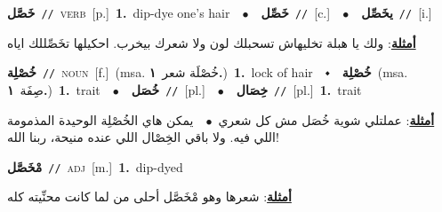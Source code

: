 \documentclass[10pt,a4paper,twoside]{article} %
\begin{document}
\begin{multicols}{2}
{\setlength\topsep{0pt}\textbf{\foreignlanguage{arabic}{خَصَّل}}\ {\color{gray}\texttt{//}\color{black}}\ \textsc{verb}\ [p.]\ \textbf{1.}~dip-dye one's hair\ \ $\bullet$\ \ \setlength\topsep{0pt}\textbf{\foreignlanguage{arabic}{خَصِّل}}\ {\color{gray}\texttt{//}\color{black}}\ [c.]\ \ $\bullet$\ \ \setlength\topsep{0pt}\textbf{\foreignlanguage{arabic}{يخَصِّل}}\ {\color{gray}\texttt{//}\color{black}}\ [i.]\  \begin{flushright}\color{gray}\foreignlanguage{arabic}{\textbf{\underline{\foreignlanguage{arabic}{أمثلة}}}: ولك يا هبلة تخليهاش تسحبلك لون ولا شعرك بيخرب. احكيلها  تخَصِّللك اياه}\end{flushright}\color{black}} \vspace{2mm}

{\setlength\topsep{0pt}\textbf{\foreignlanguage{arabic}{خُصْلِة}}\ {\color{gray}\texttt{//}\color{black}}\ \textsc{noun}\ [f.]\ \color{gray}(msa. \foreignlanguage{arabic}{خُصْلَة شعر}~\foreignlanguage{arabic}{\textbf{١.}})\color{black}\ \textbf{1.}~lock of hair\ \ $\smblkdiamond$\ \ \setlength\topsep{0pt}\textbf{\foreignlanguage{arabic}{خُصْلِة}}\ \color{gray}(msa. \foreignlanguage{arabic}{صِفَة}~\foreignlanguage{arabic}{\textbf{١.}})\color{black}\ \textbf{1.}~trait\ \ $\bullet$\ \ \setlength\topsep{0pt}\textbf{\foreignlanguage{arabic}{خُصَل}}\ {\color{gray}\texttt{//}\color{black}}\ [pl.]\ \ $\bullet$\ \ \setlength\topsep{0pt}\textbf{\foreignlanguage{arabic}{خِصَال}}\ {\color{gray}\texttt{//}\color{black}}\ [pl.]\ \textbf{1.}~trait\  \begin{flushright}\color{gray}\foreignlanguage{arabic}{\textbf{\underline{\foreignlanguage{arabic}{أمثلة}}}: عملتلي شوية خُصَل مش كل شعري\ $\bullet$\ \  يمكن هاي الخُصْلِة الوحيدة المذمومة اللي فيه. ولا باقي الخِصْال اللي عنده منيحة، ربنا الله!}\end{flushright}\color{black}} \vspace{2mm}

{\setlength\topsep{0pt}\textbf{\foreignlanguage{arabic}{مْخَصَّل}}\ {\color{gray}\texttt{//}\color{black}}\ \textsc{adj}\ [m.]\ \textbf{1.}~dip-dyed\  \begin{flushright}\color{gray}\foreignlanguage{arabic}{\textbf{\underline{\foreignlanguage{arabic}{أمثلة}}}: شعرها وهو مْخَصَّل أحلى من لما كانت محنِّيته كله}\end{flushright}\color{black}} \vspace{2mm}


\end{multicols}
\end{document}
